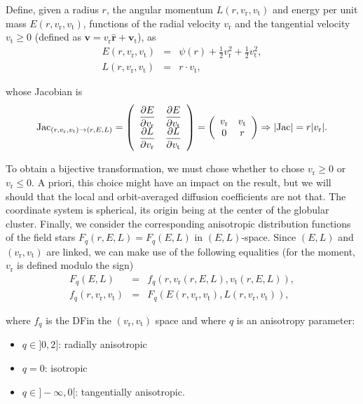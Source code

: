\documentclass[11pt]{article}
\newcommand{\DF}{\ac{DF}}
\newcommand{\rt}{\mathrm{t}}
\newcommand{\rr}{\mathrm{r}}
\newcommand{\vr}{v_{\rr}}
\newcommand{\vt}{v_{\rt}}
\newcommand{\bv}{\boldsymbol{v}}
\newcommand{\bvt}{\boldsymbol{v}_{\mathrm{t}}}
\newcommand{\br}{\boldsymbol{r}}
\newcommand{\hr}{\hat{\br}}
\newcommand{\Fq}{F_{q}}
\newcommand{\fq}{f_{q}}
\begin{document}
Define, given a radius $r$, the angular momentum $L(r,\vr,\vt)$
and energy per unit mass $E(r,\vr,\vt)$, functions of
the radial velocity $\vr$ and the tangential velocity $\vt\geq 0$
(defined as $\bv=\vr \hr + \bvt$),
as
\begin{equation}
\begin{array}{ccl}
E(r,\vr,\vt) & = & \psi(r)+\frac{1}{2} \vr^{2}+\frac{1}{2}\vt^{2} ,\\
L(r,\vr,\vt) & = & r \cdot \vt ,
\end{array}
\label{eq:v_to_E_L}
\end{equation}

whose Jacobian is
\begin{equation}
{\rm Jac}_{(r,\vr,\vt)\rightarrow(r,E,L)}=\left(\begin{array}{cc}
\displaystyle{\frac{\partial E}{\partial \vr}} & \displaystyle{\frac{\partial E}{\partial \vt}}\\
\displaystyle{\frac{\partial L}{\partial \vr}} & \displaystyle{\frac{\partial L}{\partial \vt}}
\end{array}\right)=\left(\begin{array}{cc}
\vr & \vt\\
0 & r
\end{array}\right)\Rightarrow|{\rm Jac}|=r|\vr| .
\label{eq:Jacobian}
  \end{equation}

To obtain a bijective transformation, we must chose whether to chose
$\vr\ge 0$ or $\vr\leq 0$. A priori, this choice might have an
impact on the result, but we will should that the local and orbit-averaged
diffusion coefficients are not that. The coordinate system is spherical,
its origin being at the center of the globular cluster. Finally, we
consider the corresponding anisotropic distribution functions of the
field stars $\Fq(r,E,L)= \Fq(E,L)$ in $(E,L)$-space. Since $(E,L)$
and $(\vr,\vt)$ are linked, we can make use of the following
equalities (for the moment, $\vr$ is defined modulo the sign)
\begin{equation}
\begin{array}{ccl}
\Fq(E,L) &=&\displaystyle{\fq(r,\vr(r,E,L),\vt(r,E,L))} ,\\
\fq(r,\vr,\vt)&=&\displaystyle{F_{q}(E(r,\vr,\vt),L(r,\vr,\vt))} ,
\end{array}
\label{eq:conversion_DF}
\end{equation}

where $\fq$ is the \DF in the $(\vr,\vt)$ space and where $q$ is an anisotropy
parameter:
\begin{itemize}
\item $q\in]0,2]$: radially anisotropic
\item $q=0$: isotropic
\item $q\in]-\infty,0[$: tangentially anisotropic.
\end{itemize}
\end{document}

